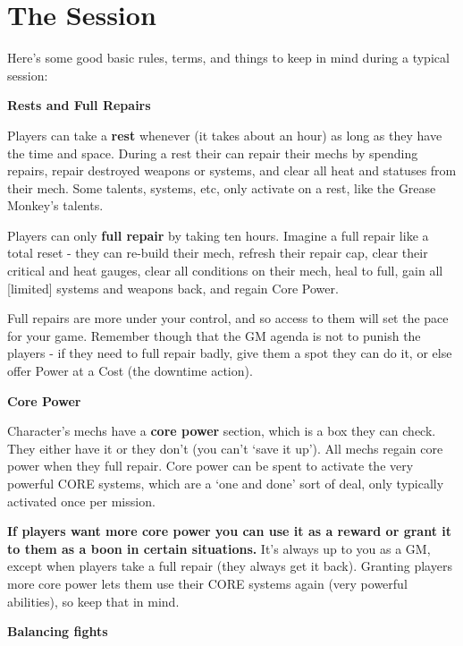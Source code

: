 \section{The Session}

Here’s some good basic rules, terms, and things to keep in mind during a typical session:

\begin{center}
     \textbf{Rests and Full Repairs}
\end{center}

Players can take a \textbf{rest} whenever (it takes about an hour) as long as they have the time and
space. During a rest their can repair their mechs by spending repairs, repair destroyed weapons
or systems, and clear all heat and statuses from their mech. Some talents, systems, etc, only
activate on a rest, like the Grease Monkey’s talents.

Players can only \textbf{full repair} by taking ten hours. Imagine a full repair like a total reset - they can
re-build their mech, refresh their repair cap, clear their critical and heat gauges, clear all
conditions on their mech, heal to full, gain all [limited] systems and weapons back, and regain
Core Power.

Full repairs are more under your control, and so access to them will set the pace for your game.
Remember though that the GM agenda is not to punish the players - if they need to full repair
badly, give them a spot they can do it, or else offer Power at a Cost (the downtime action).

\begin{center}
     \textbf{Core Power}
\end{center}

Character’s mechs have a \textbf{core power} section, which is a box they can check. They either have
it or they don’t (you can’t ‘save it up’). All mechs regain core power when they full repair. Core
power can be spent to activate the very powerful CORE systems, which are a ‘one and done’
sort of deal, only typically activated once per mission.

\textbf{If players want more core power you can use it as a reward or grant it to them as a boon in
certain situations.} It’s always up to you as a GM, except when players take a full repair (they
always get it back). Granting players more core power lets them use their CORE systems again
(very powerful abilities), so keep that in mind.

\begin{center}
     \textbf{Balancing fights}
\end{center}


